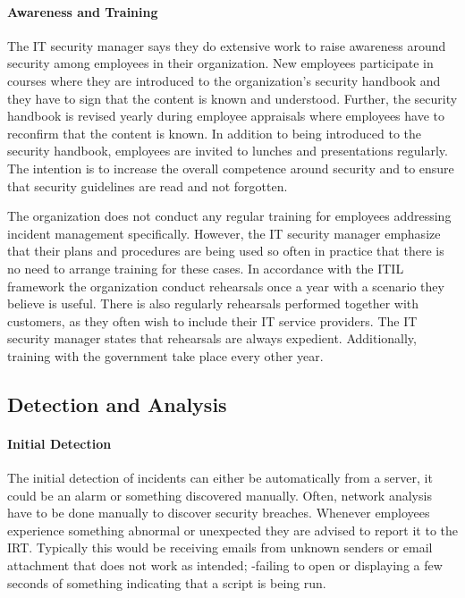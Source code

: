 \paragraph{Awareness and Training}
The IT security manager says they do extensive work to raise awareness around security among employees in their organization. New employees participate in courses where they are introduced to the organization's security handbook and they have to sign that the content is known and understood. Further, the security handbook is revised yearly during employee appraisals where employees have to reconfirm that the content is known.  
In addition to being introduced to the security handbook, employees are invited to lunches and presentations regularly. The intention is to increase the overall competence around security and to ensure that security guidelines are read and not forgotten.

The organization does not conduct any regular training for employees addressing incident management specifically. However, the IT security manager emphasize that their plans and procedures are being used so often in practice that there is no need to arrange training for these cases. 
In accordance with the ITIL framework the organization conduct rehearsals once a year with a scenario they believe is useful. There is also regularly rehearsals performed together with customers, as they often wish to include their IT service providers. The IT security manager states that rehearsals are always expedient. Additionally, training with the government take place every other year. 

\subsection{Detection and Analysis}
\paragraph{Initial Detection}
The initial detection of incidents can either be automatically from a server, it could be an alarm or something discovered manually. Often, network analysis have to be done manually to discover security breaches. Whenever employees experience something abnormal or unexpected they are advised to report it to the \ac{IRT}. Typically this would be receiving emails from unknown senders or email attachment that does not work as intended; -failing to open or displaying a few seconds of something indicating that a script is being run.

